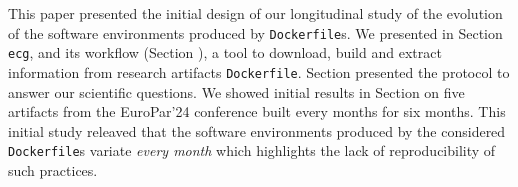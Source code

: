 \documentclass[sigconf,natbib=false]{acmart}
\newcommand{\ie}{\emph{i.e.,}}
\newcommand{\df}{\texttt{Dockerfile}}
\newcommand{\ecg}{\texttt{ecg}}
\newcommand{\todo}[1]{{\color{red}{TODO: #1}}}
\begin{document}
% 
% 
% 
% 
% 
% 


This paper presented the initial design of our longitudinal study of the evolution of the software environments produced by \df s.
We presented in Section \todo{ecg} \ecg, and its workflow (Section \todo{}), a tool to download, build and extract information from research artifacts \df.
Section \todo{protocole} presented the protocol to answer our scientific questions.
We showed initial results in Section \todo{expes} on five artifacts from the EuroPar'24 conference built every months for six months.
This initial study releaved that the software environments produced by the considered \df s variate \emph{every month} which highlights the lack of reproducibility of such practices.
\end{document}
